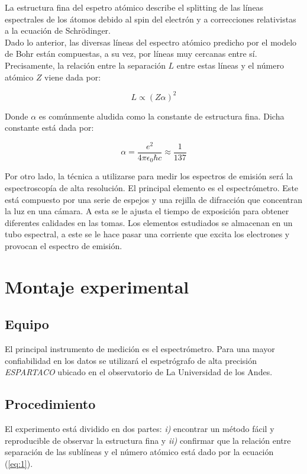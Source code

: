 \documentclass[prb,aps,twocolumn,preprintnumbers,amsmath,amssymb]{revtex4}
\begin{document}
La estructura fina del espetro atómico describe el splitting de las líneas espectrales de los átomos debido al spin del electrón y a correcciones relativistas a la ecuación de Schrödinger. \\

Dado lo anterior, las diversas líneas del espectro atómico predicho por el modelo de Bohr están compuestas, a su vez, por líneas muy cercanas entre sí. Precisamente, la relación entre la separación $L$ entre estas líneas  y el número atómico $Z$ viene dada por:

\begin{equation}
\label{eq:1}
L \propto (Z\alpha)^2
\end{equation}

Donde $\alpha$ es comúnmente aludida como la constante de estructura fina. Dicha constante está dada por:

\begin{equation}
\label{eq:2}
\alpha = \dfrac{e^2}{4 \pi \epsilon_0 \hbar c} \approx \dfrac{1}{137} 
\end{equation}

Por otro lado, la técnica a utilizarse para medir los espectros de emisión será la espectroscopía de alta resolución. El principal elemento es el espectrómetro. Este está compuesto por una serie de espejos y una rejilla de difracción que concentran la luz en una cámara. A esta se le ajusta el tiempo de exposición para obtener diferentes calidades en las tomas. Los elementos estudiados se almacenan en un tubo espectral, a este se le hace pasar una corriente que excita los electrones y provocan el espectro de emisión.


\section{Montaje experimental}

\subsection{Equipo}
El principal instrumento de medición es el espectrómetro. Para una mayor confiabilidad en los datos se utilizará el espetrógrafo de alta precisión \textit{ESPARTACO} ubicado en el observatorio de La Universidad de los Andes. 

\subsection{Procedimiento}
El experimento está dividido en dos partes: \textit{i)} encontrar un método fácil y reproducible de observar la estructura fina y \textit{ii)} confirmar que la relación entre separación de las sublíneas y el número atómico está dado por la ecuación (\ref{eq:1}). \\
\end{document}

